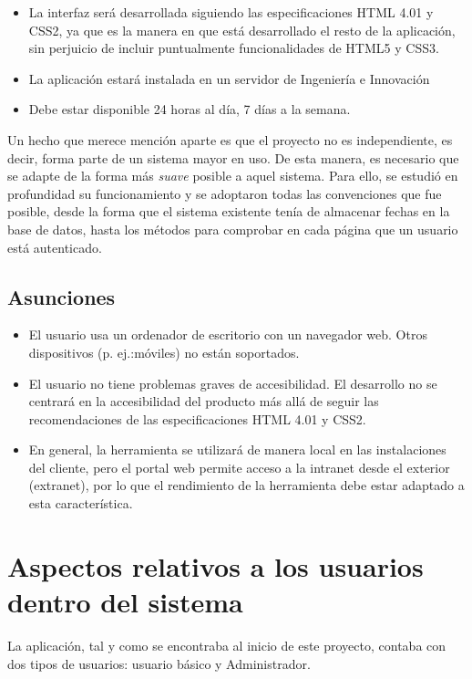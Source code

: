 \begin{itemize}
 \item La interfaz será desarrollada siguiendo las especificaciones HTML 4.01 y
CSS2, ya que es la manera en que está desarrollado el resto de la aplicación,
sin perjuicio de incluir puntualmente funcionalidades de HTML5 y CSS3.
\item La aplicación estará instalada en un servidor de Ingeniería e Innovación
\item Debe estar disponible 24 horas al día, 7 días a la semana.
\end{itemize}

Un hecho que merece mención aparte es que el proyecto no es independiente, es
decir, forma parte de un sistema mayor en uso. De esta manera, es necesario que
se adapte de la forma más \textit{suave} posible a aquel sistema. Para ello, se
estudió en profundidad su funcionamiento y se adoptaron todas las convenciones
que fue posible, desde la forma que el sistema existente tenía de almacenar
fechas en la base de datos, hasta los métodos para comprobar en cada página que
un usuario está autenticado.

\subsection{Asunciones}

\begin{itemize}
\item El usuario usa un ordenador de escritorio con un navegador web. Otros
dispositivos (p. ej.:móviles) no están soportados.
\item El usuario no tiene problemas graves de accesibilidad. El desarrollo no
se centrará en la accesibilidad del producto más allá de seguir las
recomendaciones de las especificaciones HTML 4.01 y CSS2.
\item En general, la herramienta se utilizará de manera local en las
instalaciones del cliente, pero el portal web permite acceso a la intranet
desde el exterior (extranet), por lo que el rendimiento de la herramienta debe
estar adaptado a esta característica.
\end{itemize}

\section{Aspectos relativos a los usuarios dentro del sistema}
\label{sec:usuarios_del_sistema}

La aplicación, tal y como se encontraba al inicio de este proyecto, contaba con
dos tipos de usuarios: usuario básico y Administrador.

